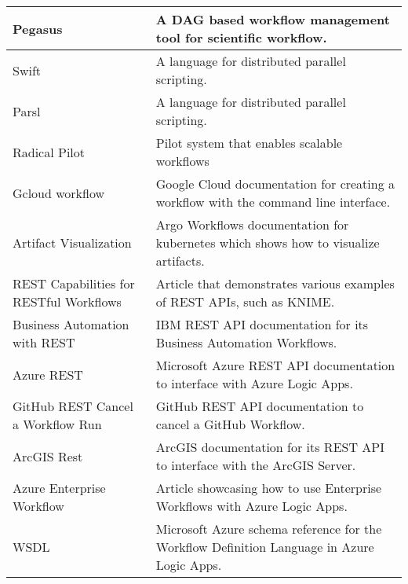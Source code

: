 \begin{table*}[htb]
{{\begin{tabular}{|p{3cm}p{12cm}|}
Pegasus  \cite{www-pegasus} &  A DAG based workflow management tool for scientific workflow.  \\
\hline

Swift \cite{las-2007-swift} & A language for distributed parallel scripting.\\
\hline

Parsl \cite{www-parsl} & A language for distributed parallel scripting. \\
\hline

Radical Pilot \cite{arxiv-radical-pilot} & Pilot system that enables scalable workflows \\ 
\hline

Gcloud workflow \cite{www-gcloud} & Google Cloud documentation for creating a workflow with the command line interface. \\
\hline

Artifact Visualization \cite{www-artifact} & Argo Workflows documentation for kubernetes which shows how to visualize artifacts. \\
\hline

REST Capabilities for RESTful Workflows \cite{www-rest-workflows} & Article that demonstrates various examples of REST APIs, such as KNIME. \\
\hline

Business Automation with REST \cite{www-business-rest-ibm} & IBM REST API documentation for its Business Automation Workflows. \\
\hline

Azure REST \cite{www-azure-rest} & Microsoft Azure REST API documentation to interface with Azure Logic Apps. \\
\hline

GitHub REST Cancel a Workflow Run \cite{www-github-rest-cancel} & GitHub REST API documentation to cancel a GitHub Workflow. \\
\hline

ArcGIS Rest \cite{www-arcgis-rest} & ArcGIS documentation for its REST API to interface with the ArcGIS Server. \\
\hline

Azure Enterprise Workflow \cite{www-azure-enterprise-workflow} & Article showcasing how to use Enterprise Workflows with Azure Logic Apps. \\
\hline

WSDL \cite{www-wsdl} & Microsoft Azure schema reference for the Workflow Definition Language in Azure Logic Apps. \\
\hline


\end{tabular}}}
\end{table*}

